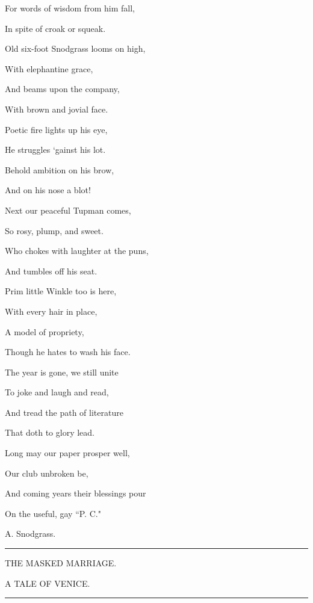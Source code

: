 For words of wisdom from him fall,

In spite of croak or squeak.

\hfill\break

Old six-foot Snodgrass looms on high,

With elephantine grace,

And beams upon the company,

With brown and jovial face.

\hfill\break

Poetic fire lights up his eye,

He struggles `gainst his lot.

Behold ambition on his brow,

And on his nose a blot!

\hfill\break

Next our peaceful Tupman comes,

So rosy, plump, and sweet.

Who chokes with laughter at the puns,

And tumbles off his seat.

\hfill\break

Prim little Winkle too is here,

With every hair in place,

A model of propriety,

Though he hates to wash his face.

\hfill\break

The year is gone, we still unite

To joke and laugh and read,

And tread the path of literature

That doth to glory lead.

\hfill\break

Long may our paper prosper well,

Our club unbroken be,

And coming years their blessings pour

On the useful, gay ``P. C."

A. Snodgrass.

\begin{center}\rule{0.5\linewidth}{0.5pt}\end{center}

THE MASKED MARRIAGE.

A TALE OF VENICE.

\begin{center}\rule{0.5\linewidth}{0.5pt}\end{center}

